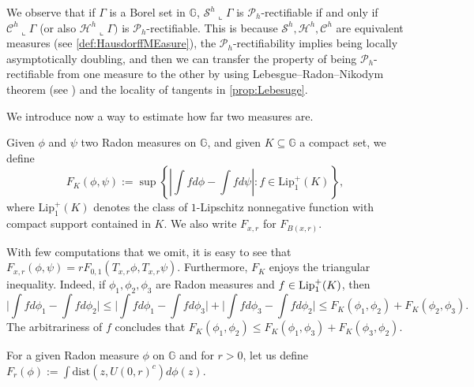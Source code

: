 \documentclass[10pt, a4paper,
oneside, headinclude,footinclude]{scrartcl}
\begin{document}
\begin{osservazione}\label{rem:ShPRectifiableIfAndOnlyIf}
We observe that if $\Gamma$ is a Borel set in $\mathbb G$, $\mathcal{S}^h\llcorner\Gamma$ is $\mathscr{P}_h$-rectifiable if and only if $\mathcal{C}^h\llcorner\Gamma$ (or also $\mathcal{H}^h\llcorner\Gamma)$ is $\mathscr{P}_h$-rectifiable. This is because $\mathcal{S}^h,\mathcal{H}^h,\mathcal{C}^h$ are equivalent measures (see \cref{def:HausdorffMEasure}), the $\mathscr{P}_h$-rectifiability implies being locally asymptotically doubling, and then we can transfer the property of being $\mathscr{P}_h$-rectifiable from one measure to the other by using Lebesgue--Radon--Nikodym theorem (see \cite[page 82]{HeinonenKoskelaShanmugalingam}) and the locality of tangents in \cref{prop:Lebesuge}.
\end{osservazione}


We introduce now a way to estimate how far two measures are.

\begin{definizione}[Definition of $F_K$]\label{def:Fk}
Given $\phi$ and $\psi$ two Radon measures on $\mathbb G$, and given $K\subseteq \mathbb G$ a compact set, we define 
\begin{equation}
    F_K(\phi,\psi):= \sup\left\{\left|\int fd\phi - \int fd\psi\right|:f\in \mathrm{Lip}_1^+(K)\right\},
    \label{eq:F}
\end{equation}
where $\mathrm{Lip}_1^+(K)$ denotes the class of $1$-Lipschitz nonnegative function with compact support contained in $K$. We also write $F_{x,r}$ for $F_{B(x,r)}$.
\end{definizione}

\begin{osservazione}[Properties of $F_K$]\label{rem:ScalinfFxr}
With few computations that we omit, it is easy to see that $F_{x,r}(\phi,\psi)=rF_{0,1}(T_{x,r}\phi,T_{x,r}\psi)$. Furthermore, $F_K$ enjoys the triangular inequality. Indeed, if $\phi_1,\phi_2,\phi_3$ are Radon measures and $f\in\operatorname*{Lip_1^+}(K)$, then
$$\Big\lvert\int fd\phi_1-\int fd\phi_2\Big\rvert\leq \Big\lvert\int fd\phi_1-\int fd\phi_3\Big\rvert+\Big\lvert\int fd\phi_3-\int fd\phi_2\Big\rvert\leq F_K(\phi_1,\phi_2)+F_K(\phi_2,\phi_3).$$
The arbitrariness of $f$ concludes that $F_K(\phi_1,\phi_2)\leq F_K(\phi_1,\phi_3)+F_K(\phi_3,\phi_2)$.
\end{osservazione}

\begin{definizione}[Definition of $F_r$]\label{def:Fr}
 For a given Radon measure $\phi$ on $\mathbb G$ and for $r>0$, let us define $F_r(\phi):=\int \text{dist}(z,U(0,r)^c)d\phi(z)$. 
\end{definizione} 
\end{document}
